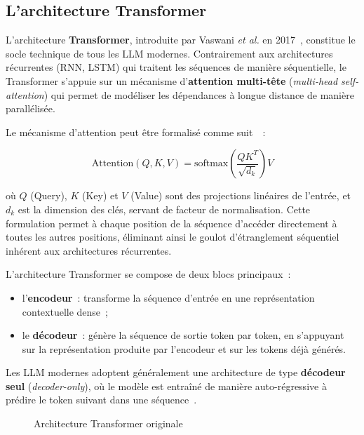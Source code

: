 \subsection{L'architecture Transformer}

L'architecture \textbf{Transformer}, introduite par Vaswani \textit{et al.} en 2017~\cite{vaswani2017}, constitue le socle technique de tous les LLM modernes. Contrairement aux architectures récurrentes (RNN, LSTM) qui traitent les séquences de manière séquentielle, le Transformer s'appuie sur un mécanisme d'\textbf{attention multi-tête} (\textit{multi-head self-attention}) qui permet de modéliser les dépendances à longue distance de manière parallélisée.

Le mécanisme d'attention peut être formalisé comme suit~\cite{vaswani2017}~:

\begin{equation}
\text{Attention}(Q, K, V) = \text{softmax}\left(\frac{QK^T}{\sqrt{d_k}}\right)V
\end{equation}

\noindent où $Q$ (Query), $K$ (Key) et $V$ (Value) sont des projections linéaires de l'entrée, et $d_k$ est la dimension des clés, servant de facteur de normalisation. Cette formulation permet à chaque position de la séquence d'accéder directement à toutes les autres positions, éliminant ainsi le goulot d'étranglement séquentiel inhérent aux architectures récurrentes.

L'architecture Transformer se compose de deux blocs principaux~:

\begin{itemize}[noitemsep]
    \item l'\textbf{encodeur}~: transforme la séquence d'entrée en une représentation contextuelle dense~;
    \item le \textbf{décodeur}~: génère la séquence de sortie token par token, en s'appuyant sur la représentation produite par l'encodeur et sur les tokens déjà générés.
\end{itemize}

Les LLM modernes adoptent généralement une architecture de type \textbf{décodeur seul} (\textit{decoder-only}), où le modèle est entraîné de manière auto-régressive à prédire le token suivant dans une séquence~\cite{brown2020}.

\begin{figure}[H]
    \centering
    \caption{Architecture Transformer originale~\cite{vaswani2017}}
    \label{fig:transformer}
\end{figure}

